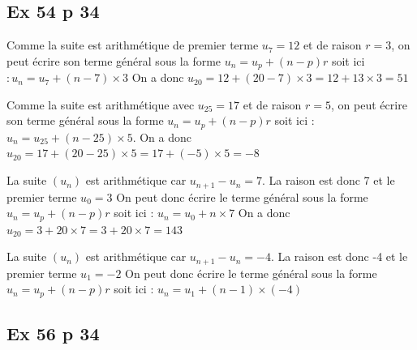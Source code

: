 \documentclass[a4paper,french]{book}
\begin{document}
\subsection*{Ex 54 p 34}

\begin{enumMet}
    \item Comme la suite est arithmétique de premier terme $u_{7}=12$ et de raison $r=3$, on peut écrire son terme général sous la forme $u_{n}=u_{p}+(n-p) r$ soit ici $: u_{n}=u_{7}+(n-7) \times 3$ On a donc $u_{20}=12+(20-7) \times 3=12+13 \times 3=51$
    \item Comme la suite est arithmétique avec $u_{25}=17$ et de raison $r=5$, on peut écrire son terme général sous la forme $u_{n}=u_{p}+(n-p) r$ soit ici : $u_{n}=u_{25}+(n-25) \times 5$. On a donc $u_{20}=17+(20-25) \times 5=17+(-5) \times 5=-8$
    \item La suite $\left(u_{n}\right)$ est arithmétique car $u_{n+1}-u_{n}=7$. La raison est donc 7 et le premier terme $u_{0}=3$
    On peut donc écrire le terme général sous la forme $u_{n}=u_{p}+(n-p) r$ soit ici :
    $u_{n}=u_{0}+n \times 7$
    On a donc $u_{20}=3+20 \times 7=3+20 \times 7=143$
    \item La suite $\left(u_{n}\right)$ est arithmétique car $u_{n+1}-u_{n}=-4$. La raison est donc -4 et le premier terme $u_{1}=-2$
    On peut donc écrire le terme général sous la forme $u_{n}=u_{p}+(n-p) r$ soit ici :
    $u_{n}=u_{1}+(n-1) \times(-4)$
\end{enumMet}



\subsection*{Ex 56 p 34}
\end{document}
